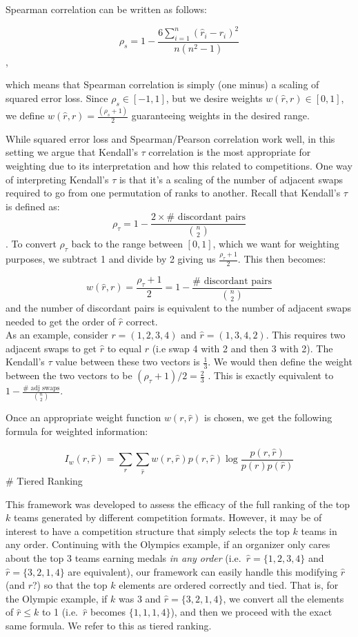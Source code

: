 \documentclass[
  12pt,
]{article}
\begin{document}
Spearman correlation can be written as follows:

\[
\rho_{s} =  1 - \frac{6  \sum_{i=1}^n (\hat{r}_i - r_i)^2}{n(n^2 - 1)}
\],

which means that Spearman correlation is simply (one minus) a scaling of
squared error loss. Since \(\rho_{s} \in [-1,1]\), but we desire weights
\(w(\hat{r},r) \in [0,1]\), we define
\(w(\hat{r},r) = \frac{(\rho_s + 1)}{2}\) guaranteeing weights in the
desired range.

While squared error loss and Spearman/Pearson correlation work well, in
this setting we argue that Kendall's \(\tau\) correlation is the most
appropriate for weighting due to its interpretation and how this related
to competitions. One way of interpreting Kendall's \(\tau\) is that it's
a scaling of the number of adjacent swaps required to go from one
permutation of ranks to another. Recall that Kendall's \(\tau\) is
defined as: \[
\rho_\tau = 1 - \frac{2 \times \# \text{ discordant pairs}}{{n \choose 2}}
\]. To convert \(\rho_\tau\) back to the range between \([0,1]\), which
we want for weighting purposes, we subtract 1 and divide by 2 giving us
\(\frac{\rho_\tau + 1}{2}\). This then becomes:

\[
w(\hat{r},r) = \frac{\rho_\tau + 1}{2} = 1 - \frac{\# \text{ discordant pairs}}{{n \choose 2}}
\] and the number of discordant pairs is equivalent to the number of
adjacent swaps needed to get the order of \(\hat{r}\) correct.\\
As an example, consider \(r = (1,2,3,4)\) and \(\hat{r} = (1,3,4,2)\).
This requires two adjacent swaps to get \(\hat{r}\) to equal \(r\) (i.e
swap 4 with 2 and then 3 with 2). The Kendall's \(\tau\) value between
these two vectors is \(\frac{1}{3}\). We would then define the weight
between the two vectors to be \((\rho_{\tau} + 1)/2 = \frac{2}{3}\) .
This is exactly equivalent to
\(1 - \frac{\#\text{ adj swaps}}{{n \choose 2}}\).

Once an appropriate weight function \(w(r, \hat{r})\) is chosen, we get
the following formula for weighted information:

\[
I_w(r,\hat{r})= \sum_{r}\sum_{\hat{r}}w(r, \hat{r})p(r,\hat{r})\log \frac {p(r,\hat{r})}{p(r)p(\hat{r})}
\] \# Tiered Ranking

This framework was developed to assess the efficacy of the full ranking
of the top \(k\) teams generated by different competition formats.
However, it may be of interest to have a competition structure that
simply selects the top \(k\) teams in any order. Continuing with the
Olympics example, if an organizer only cares about the top 3 teams
earning medals \emph{in any order} (i.e.~\(\hat{r} = \{1,2,3,4\}\) and
\(\hat{r} = \{3,2,1,4\}\) are equivalent), our framework can easily
handle this modifying \(\hat{r}\) (and \(r\)?) so that the top \(k\)
elements are ordered correctly and tied. That is, for the Olympic
example, if \(k\) was 3 and \(\hat{r} = \{3,2,1,4\}\), we convert all
the elements of \(\hat{r} \le k\) to 1 (i.e.~\(\hat{r}\) becomes
\(\{1,1,1,4\}\)), and then we proceed with the exact same formula. We
refer to this as tiered ranking.
\end{document}
